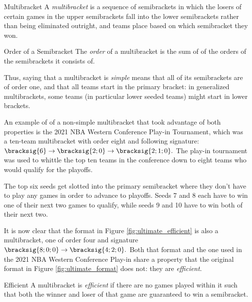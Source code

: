{    \begin{definition}{Multibracket}{} 
        A \textit{multibracket} is a sequence of semibrackets in which the losers of certain games in the upper semibrackets fall into the lower semibrackets rather than being eliminated outright, and teams place based on which semibracket they won.
    \end{definition}

    \begin{definition}{Order of a Semibracket}{}
        The \textit{order} of a multibracket is the sum of of the orders of the semibrackets it consists of.
    \end{definition}

    Thus, saying that a multibracket is \textit{simple} means that all of its semibrackets are of order one, and that all teams start in the primary bracket: in generalized multibrackets, some teams (in particular lower seeded teams) might start in lower brackets.
    
    An example of of a non-simple multibracket that took advantage of both properties is the 2021 NBA Western Conference Play-in Tournament, which was a ten-team multibracket with order eight and following signature:
    $\bracksig{6} \to \bracksig{2;0} \to \bracksig{2;1;0}.$ The play-in tournament was used to whittle the top ten teams in the conference down to eight teams who would qualify for the playoffs.


    The top six seeds get slotted into the primary semibracket where they don't have to play any games in order to advance to playoffs. Seeds 7 and 8 each have to win one of their next two games to qualify, while seeds 9 and 10 have to win both of their next two.

    It is now clear that the format in Figure \ref{fig:ultimate_efficient} is also a multibracket, one of order four and signature $\bracksig{8;0;0} \to \bracksig{4;2;0}.$ Both that format and the one used in the 2021 NBA Western Conference Play-in share a property that the original format in Figure \ref{fig:ultimate_format} does not: they are \textit{efficient}.

    \begin{definition}{Efficient}{}
        A multibracket is \textit{efficient} if there are no games played within it such that both the winner and loser of that game are guaranteed to win a semibracket.
    \end{definition}

}
